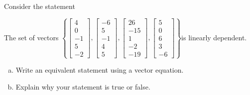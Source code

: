
\begin{exerciseStatement}


Consider the statement 
\begin{center}\begin{minipage}{0.8\textwidth}
 The set of vectors \( \left\{ \left[\begin{array}{c}
4 \\
0 \\
-1 \\
5 \\
-2
\end{array}\right] , \left[\begin{array}{c}
-6 \\
5 \\
-1 \\
4 \\
5
\end{array}\right] , \left[\begin{array}{c}
26 \\
-15 \\
1 \\
-2 \\
-19
\end{array}\right] , \left[\begin{array}{c}
5 \\
0 \\
6 \\
3 \\
-6
\end{array}\right] \right\} \)is linearly dependent.
\end{minipage}\end{center}
    


\begin{enumerate}[(a)]
\item  Write an equivalent statement using a vector equation.
\item  Explain why your statement is true or false.
\end{enumerate}
    
\end{exerciseStatement}
    
